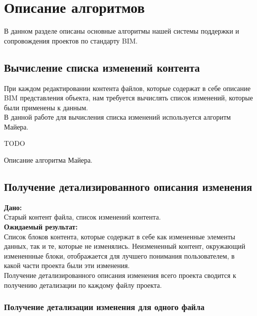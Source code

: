 \documentclass[a4paper,14pt]{extreport} %
\begin{document}
\newpage
\section{Описание алгоритмов}
В данном разделе описаны основные алгоритмы нашей системы поддержки и сопровождения проектов по стандарту BIM.

\subsection{Вычисление списка изменений контента} 
При каждом редактировании контента файлов, которые содержат в себе описание BIM представления объекта, нам требуется вычислять список изменений, которые были применены к данным. \\
В данной работе для вычисления списка изменений используется алгоритм Майера. \\

\begin{algorithm}[H]
TODO
\caption{Описание алгоритма Майера.}
\label{MYERS_ALGO}
\end{algorithm}

\newpage
\subsection{Получение детализированного описания изменения} 
\textbf{Дано:} \\
Старый контент файла, список изменений контента. \\
\textbf{Ожидаемый результат:} \\
Список блоков контента, которые содержат в себе как измененные элементы данных, так и те, которые не изменялись. Неизмененный контент, окружающий измененнные блоки, отображается для лучшего понимания пользователем, в какой части проекта были эти изменения. \\
Получение детализированного описания изменения всего проекта сводится к получению детализации по каждому файлу проекта.

\subsubsection{Получение детализации изменения для одного файла}
\end{document}
